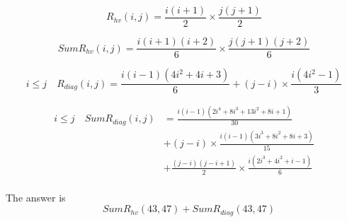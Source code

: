 \documentclass[10pt,a4paper]{letter}
\begin{document}
$$
R_{hv}(i,j)=\frac{i(i+1)}{2}\times\frac{j(j+1)}{2}
$$

$$
SumR_{hv}(i,j)=\frac{i(i+1)(i+2)}{6}\times\frac{j(j+1)(j+2)}{6}
$$

$$
i\leq j \quad R_{diag}(i,j)=\frac{i(i-1)(4i^{2}+4i+3)}{6}+(j-i)\times\frac{i(4i^{2}-1)}{3}
$$

\begin{align*}
i\leq j \quad SumR_{diag}(i,j)& =\frac{i(i-1)(2i^{4}+8i^{3}+13i^{2}+8i+1)}{30}\\
& +(j-i)\times\frac{i(i-1)(3i^{3}+8i^{2}+8i+3)}{15}\\
& +\frac{(j-i)(j-i+1)}{2}\times\frac{i(2i^{3}+4i^{2}+i-1)}{6}\\
\end{align*}

The answer is $$\quad SumR_{hv}(43,47)+SumR_{diag}(43,47)$$
\end{document}
